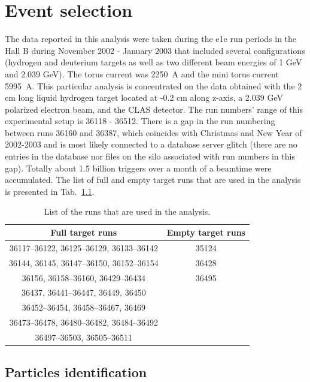 \chapter{Event selection}
\label{select}

The data reported in this analysis were taken during the e1e run periods in the Hall B during November 2002 - January 2003 that included several configurations (hydrogen and deuterium targets as well as two different beam energies of 1 GeV and 2.039 GeV). The torus current was 2250~A and the mini torus current 5995~A. This particular analysis is concentrated on the data obtained with the 2 cm long liquid hydrogen target located at -0.2 cm along z-axis, a 2.039 GeV polarized electron beam, and the CLAS detector. The run numbers' range of this experimental setup is 36118 - 36512. There is a gap in the run numbering between runs 36160 and 36387, which coincides with Christmas and New Year of 2002-2003 and is most likely connected to a database server glitch (there are no entries in the database nor files on the silo associated with run numbers in this gap). Totally about 1.5 billion triggers over a month of a beamtime were accumulated.
The  list of full and empty target runs that are used in the analysis is presented in Tab.~\ref{tab_good_runs}.

\begin{table}[htp]
\centering 




\begin{tabular}{|c|c|}

\hline
Full target runs & Empty target runs\\
\hline 
36117--36122, 36125--36129, 36133--36142 & 35124  \\
36144, 36145, 36147--36150, 36152--36154 & 36428  \\
36156, 36158--36160, 36429--36434 & 36495  \\ 
36437,  36441--36447, 36449, 36450 & \\
36452--36454, 36458--36467, 36469 & \\
36473--36478, 36480--36482, 36484--36492 & \\
36497--36503, 36505--36511 & \\
\hline 
\end{tabular}
\caption{\small List of the runs that are used in the analysis. \label{tab_good_runs}}
\end{table}

\section{Particles identification}
\label{ident}

